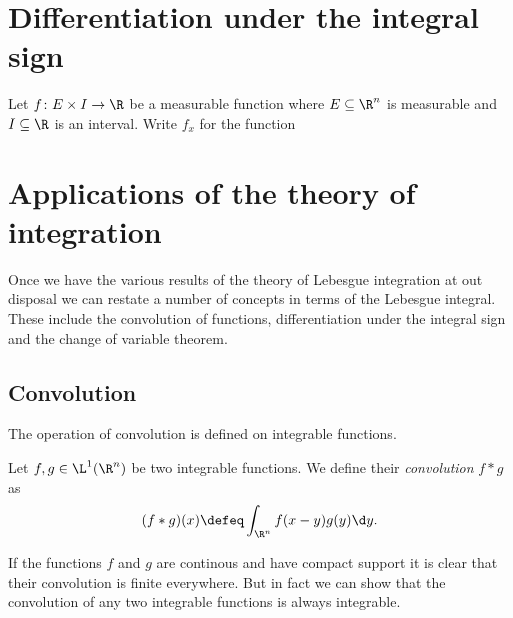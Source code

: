 \documentclass[12pt,oneside]{book}
\begin{document}
\section{Differentiation under the integral sign}

\begin{theorem}
	Let \( f \colon E \times I \to \R \) be a measurable function where \( E \subseteq \R^n
	\) is measurable and \( I	\subseteq \R \) is an interval. Write \( f_x \) for the
	function
	
	
	
\end{theorem}


\section{Applications of the theory of integration}
Once we have the various results of the theory of Lebesgue integration at out disposal we
can restate a number of concepts in terms of the Lebesgue integral. These include the
convolution of functions, differentiation under the integral sign and the change of
variable theorem. 

\subsection{Convolution}
The operation of convolution is defined on integrable functions. 

\begin{definition}[Convolution]
	Let \( f, g \in \L^1(\R^n) \) be two integrable functions. We define their
	\emph{convolution} \( f \ast g \) as
	\begin{equation*}
		(f \ast g)(x) \defeq \int_{\R^n} f(x - y) g(y) \d y.
	\end{equation*}
\end{definition}
If the functions \( f \) and \( g \) are continous and have compact support it is clear
that their convolution is finite everywhere. But in fact we can show that the convolution
of any two integrable functions is always integrable.
\end{document}
